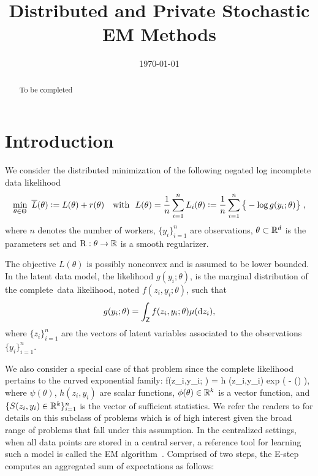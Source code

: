 \documentclass[11pt]{article}
\theoremstyle{t}
\begin{document}
\title{Distributed and Private Stochastic EM Methods}
\date{\today}

\maketitle

\begin{abstract}
To be completed
\end{abstract}


\section{Introduction}

We consider the distributed minimization of the following negated log incomplete data likelihood 
\begin{align} \label{eq:em_motivate}
\begin{split} 
 \min_{ \theta \in \Theta }~ \overline{L} ( \theta ) \mathrel{\mathop:}=  L ( \theta ) + r (\theta) \quad \text{with}~~L(\theta) = \frac{1}{n} \sum_{i=1}^n L_i( \theta) \mathrel{\mathop:}=  \frac{1}{n} \sum_{i=1}^n \big\{ - \log g( y_i ; \theta ) \big\}\;,
\end{split} 
\end{align}
where $n$ denotes the number of workers, $\{y_i\}_{i=1}^n$ are observations, $\theta \subset \mathbb{R}^d$ is the parameters set and $\operatorname{R} : \theta \rightarrow \mathbb{R}$ is a smooth regularizer.

The objective  $L( \theta )$ is possibly {nonconvex} and is assumed to be lower bounded. 
In the latent data model, the likelihood $g(y_i ; \theta)$, is the marginal distribution of the complete~data likelihood, noted $f(z_i,y_i; \theta)$, such that 
\begin{align}
g(y_i; \theta) = \int_{\mathsf{Z}} f (z_i,y_i;\theta) \mu(\mathrm d z_i),    
\end{align}
where $\{ z_i \}_{i=1}^n$ are the vectors of latent variables associated to the observations $\{y_i\}_{i=1}^n$.

We also consider a special case of that problem since the complete likelihood pertains to the curved exponential family:
\beq \label{eq:exp}
f(z_i,y_i; \theta) = h  (z_i,y_i) \textrm{exp} (  - \psi(\theta) )\eqs,
\eeq
where $\psi(\theta)$, $h(z_i,y_i)$ are scalar functions, $\phi(\theta) \in \mathbb{R}^k$ is a vector function, and $\{S(z_i,y_i) \in \mathbb{R}^k\}_{i=1}^n$ is the vector of sufficient statistics.
We refer the readers to \citep{efron1975defining} for details on this subclass of problems which is of high interest given the broad range of problems that fall under this assumption.
In the centralized settings, \ie when all data points are stored in a central server, a reference tool for learning such a model is called the EM algorithm~\citep{dempster1977Maximum, wu1983convergence}. Comprised of two steps, the E-step computes an aggregated sum of expectations as follows:
\end{document}
